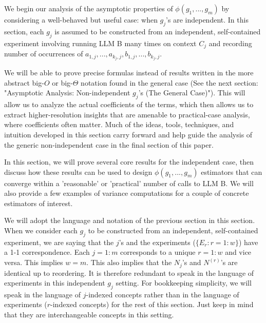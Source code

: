 \documentclass{article}
\begin{document}
We begin our analysis of the asymptotic properties of $\displaystyle \phi \left( g_{1} ,...,g_{m}\right)$ by considering a well-behaved but useful case: when $\displaystyle g_{j}$'s are independent. In this section, each $\displaystyle g_{j}$ is assumed to be constructed from an independent, self-contained experiment involving running LLM B many times on context $\displaystyle C_{j}$ and recording number of occurrences of $\displaystyle a_{1,j} ,...,a_{k_{j} ,j} ,b_{1,j} ,...,b_{k_{j} ,j}$.



We will be able to prove precise formulas instead of results written in the more abstract big-$\displaystyle O$ or big-$\displaystyle \Theta $ notation found in the general case (See the next section: "Asymptotic Analysis: Non-independent $\displaystyle g_{j}$'s (The General Case)"). This will allow us to analyze the actual coefficients of the terms, which then allows us to extract higher-resolution insights that are amenable to practical-case analysis, where coefficients often matter. Much of the ideas, tools, techniques, and intuition developed in this section carry forward and help guide the analysis of the generic non-independent case in the final section of this paper.



In this section, we will prove several core results for the independent case, then discuss how these results can be used to design $\displaystyle \phi \left( g_{1} ,...,g_{m}\right)$ estimators that can converge within a 'reasonable' or 'practical' number of calls to LLM B. We will also provide a few examples of variance computations for a couple of concrete estimators of interest.



We will adopt the language and notation of the previous section in this section. When we consider each $\displaystyle g_{j}$ to be constructed from an independent, self-contained experiment, we are saying that the $\displaystyle j$'s and the experiments ($\displaystyle \{E_{r} :r=1:w\}$) have a 1-1 correspondence. Each $\displaystyle j=1:m$ corresponds to a unique $\displaystyle r=1:w$ and vice versa. This implies $\displaystyle w=m$. This also implies that the $\displaystyle N_{j}$'s and $\displaystyle N^{\left( r\right)}$'s are identical up to reordering. It is therefore redundant to speak in the language of experiments in this independent $\displaystyle g_{j}$ setting. For bookkeeping simplicity, we will speak in the language of $\displaystyle j$-indexed concepts rather than in the language of experiments ($\displaystyle r$-indexed concepts) for the rest of this section. Just keep in mind that they are interchangeable concepts in this setting.
\end{document}
